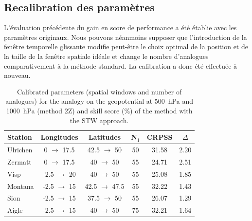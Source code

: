 \documentclass[hess]{copernicus}
\begin{document}
\subsection{Recalibration des paramètres}
\label{sec:ameliorations:fenetre:recalibration}

L'évaluation précédente du gain en score de performance a été établie avec les paramètres originaux. Nous pouvons néanmoins supposer que l'introduction de la fenêtre temporelle glissante modifie peut-être le choix optimal de la position et de la taille de la fenêtre spatiale idéale et change le nombre d'analogues comparativement à la méthode standard. La calibration a donc été effectuée à nouveau.


\begin{table}[htb]
	\caption{Calibrated parameters (spatial windows and number of analogues) for the analogy on the geopotential at 500~hPa and 1000~hPa (method 2Z) and skill score (\%) of the method with the STW approach.}
	\begin{center}
		\begin{tabular}{l c c c c c }
			\hline
			\textbf{Station} & \textbf{Longitudes} & \textbf{Latitudes} & \textbf{N$_{1}$} & \textbf{CRPSS} & \textbf{$\Delta$} \\
			\hline
			Ulrichen & 0 $\rightarrow$ 17.5 & 42.5 $\rightarrow$ 50 & 50 & 31.58 & 2.20 \\
			Zermatt & 0 $\rightarrow$ 17.5 & 40 $\rightarrow$ 50 & 55 & 24.71 & 2.51 \\
			Visp & -2.5 $\rightarrow$ 20 & 40 $\rightarrow$ 50 & 55 & 25.08 & 1.85 \\
			Montana & -2.5 $\rightarrow$ 15 & 42.5 $\rightarrow$ 47.5 & 55 & 32.22 & 1.43 \\
			Sion & -2.5 $\rightarrow$ 15 & 37.5 $\rightarrow$ 50 & 55 & 26.07 & 1.29 \\
			Aigle & -2.5 $\rightarrow$ 15 & 40 $\rightarrow$ 50 & 75 & 32.21 & 1.64 \\
			\hline
		\end{tabular}
	\end{center}
	\label{table:params_2Z_new}
\end{table}
\end{document}
